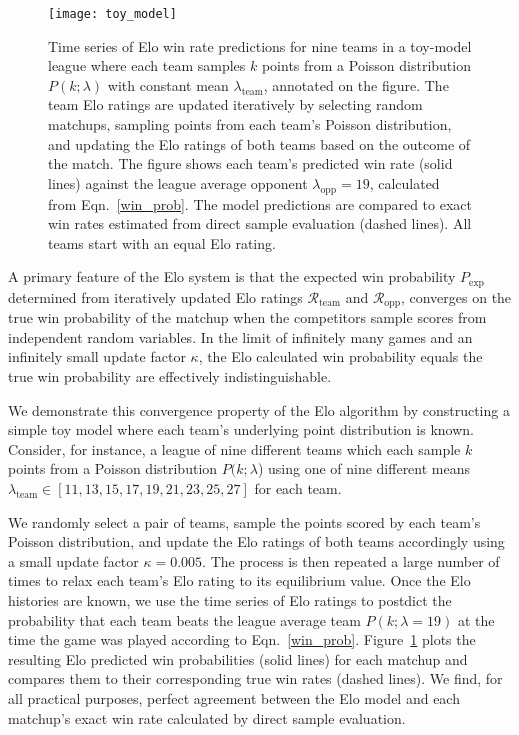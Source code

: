 \documentclass[aps,prc,reprint,amsmath,superscriptaddress,nofootinbib]{revtex4-1}
\newcommand{\R}{\mathcal{R}}
\begin{document}
\begin{figure}
  \texttt{[image: toy\_model]}
  \caption{\label{fig:toy_model} Time series of Elo win rate predictions for nine teams in a toy-model league where each team samples $k$ points from a Poisson distribution $P(k; \lambda)$ with constant mean $\lambda_\text{team}$, annotated on the figure. The team Elo ratings are updated iteratively by selecting random matchups, sampling points from each team's Poisson distribution, and updating the Elo ratings of both teams based on the outcome of the match. The figure shows each team's predicted win rate (solid lines) against the league average opponent $\lambda_\text{opp} = 19$, calculated from Eqn.~\eqref{win_prob}. The model predictions are compared to exact win rates estimated from direct sample evaluation (dashed lines). All teams start with an equal Elo rating.
  }
\end{figure}

A primary feature of the Elo system is that the expected win probability $P_\text{exp}$ determined from iteratively updated Elo ratings $\R_\text{team}$ and $\R_\text{opp}$, converges on the true win probability of the matchup when the competitors sample scores from independent random variables.
In the limit of infinitely many games and an infinitely small update factor $\kappa$, the Elo calculated win probability equals the true win probability are effectively indistinguishable.

We demonstrate this convergence property of the Elo algorithm by constructing a simple toy model where each team's underlying point distribution is known.
Consider, for instance, a league of nine different teams which each sample $k$ points from a Poisson distribution $P(k; \lambda$) using one of nine different means ${\lambda_\text{team} \in [11, 13, 15, 17, 19, 21, 23, 25, 27]}$ for each team.

We randomly select a pair of teams, sample the points scored by each team's Poisson distribution, and update the Elo ratings of both teams accordingly using a small update factor $\kappa = 0.005$.
The process is then repeated a large number of times to relax each team's Elo rating to its equilibrium value.
Once the Elo histories are known, we use the time series of Elo ratings to postdict the probability that each team beats the league average team $P(k; \lambda\!=\!19)$ at the time the game was played according to Eqn.~\eqref{win_prob}.
Figure~\ref{fig:toy_model} plots the resulting Elo predicted win probabilities (solid lines) for each matchup and compares them to their corresponding true win rates (dashed lines).
We find, for all practical purposes, perfect agreement between the Elo model and each matchup's exact win rate calculated by direct sample evaluation.
\end{document}
